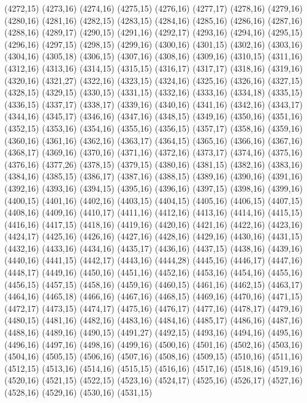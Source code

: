 (4272,15)
(4273,16)
(4274,16)
(4275,15)
(4276,16)
(4277,17)
(4278,16)
(4279,16)
(4280,16)
(4281,16)
(4282,15)
(4283,15)
(4284,16)
(4285,16)
(4286,16)
(4287,16)
(4288,16)
(4289,17)
(4290,15)
(4291,16)
(4292,17)
(4293,16)
(4294,16)
(4295,15)
(4296,16)
(4297,15)
(4298,15)
(4299,16)
(4300,16)
(4301,15)
(4302,16)
(4303,16)
(4304,16)
(4305,18)
(4306,15)
(4307,16)
(4308,16)
(4309,16)
(4310,15)
(4311,16)
(4312,16)
(4313,16)
(4314,15)
(4315,15)
(4316,17)
(4317,17)
(4318,16)
(4319,16)
(4320,16)
(4321,27)
(4322,16)
(4323,15)
(4324,16)
(4325,16)
(4326,16)
(4327,15)
(4328,15)
(4329,15)
(4330,15)
(4331,15)
(4332,16)
(4333,16)
(4334,18)
(4335,15)
(4336,15)
(4337,17)
(4338,17)
(4339,16)
(4340,16)
(4341,16)
(4342,16)
(4343,17)
(4344,16)
(4345,17)
(4346,16)
(4347,16)
(4348,15)
(4349,16)
(4350,16)
(4351,16)
(4352,15)
(4353,16)
(4354,16)
(4355,16)
(4356,15)
(4357,17)
(4358,16)
(4359,16)
(4360,16)
(4361,16)
(4362,16)
(4363,17)
(4364,15)
(4365,16)
(4366,16)
(4367,16)
(4368,17)
(4369,16)
(4370,16)
(4371,16)
(4372,16)
(4373,17)
(4374,16)
(4375,16)
(4376,16)
(4377,26)
(4378,15)
(4379,15)
(4380,16)
(4381,15)
(4382,16)
(4383,16)
(4384,16)
(4385,15)
(4386,17)
(4387,16)
(4388,15)
(4389,16)
(4390,16)
(4391,16)
(4392,16)
(4393,16)
(4394,15)
(4395,16)
(4396,16)
(4397,15)
(4398,16)
(4399,16)
(4400,15)
(4401,16)
(4402,16)
(4403,15)
(4404,15)
(4405,16)
(4406,15)
(4407,15)
(4408,16)
(4409,16)
(4410,17)
(4411,16)
(4412,16)
(4413,16)
(4414,16)
(4415,15)
(4416,16)
(4417,15)
(4418,16)
(4419,16)
(4420,16)
(4421,16)
(4422,16)
(4423,16)
(4424,17)
(4425,16)
(4426,16)
(4427,16)
(4428,16)
(4429,16)
(4430,16)
(4431,15)
(4432,16)
(4433,16)
(4434,16)
(4435,17)
(4436,16)
(4437,15)
(4438,16)
(4439,16)
(4440,16)
(4441,15)
(4442,17)
(4443,16)
(4444,28)
(4445,16)
(4446,17)
(4447,16)
(4448,17)
(4449,16)
(4450,16)
(4451,16)
(4452,16)
(4453,16)
(4454,16)
(4455,16)
(4456,15)
(4457,15)
(4458,16)
(4459,16)
(4460,15)
(4461,16)
(4462,15)
(4463,17)
(4464,16)
(4465,18)
(4466,16)
(4467,16)
(4468,15)
(4469,16)
(4470,16)
(4471,15)
(4472,17)
(4473,15)
(4474,17)
(4475,16)
(4476,17)
(4477,16)
(4478,17)
(4479,16)
(4480,15)
(4481,16)
(4482,16)
(4483,16)
(4484,16)
(4485,17)
(4486,16)
(4487,16)
(4488,16)
(4489,16)
(4490,15)
(4491,27)
(4492,15)
(4493,16)
(4494,16)
(4495,16)
(4496,16)
(4497,16)
(4498,16)
(4499,16)
(4500,16)
(4501,16)
(4502,16)
(4503,16)
(4504,16)
(4505,15)
(4506,16)
(4507,16)
(4508,16)
(4509,15)
(4510,16)
(4511,16)
(4512,15)
(4513,16)
(4514,16)
(4515,15)
(4516,16)
(4517,16)
(4518,16)
(4519,16)
(4520,16)
(4521,15)
(4522,15)
(4523,16)
(4524,17)
(4525,16)
(4526,17)
(4527,16)
(4528,16)
(4529,16)
(4530,16)
(4531,15)
